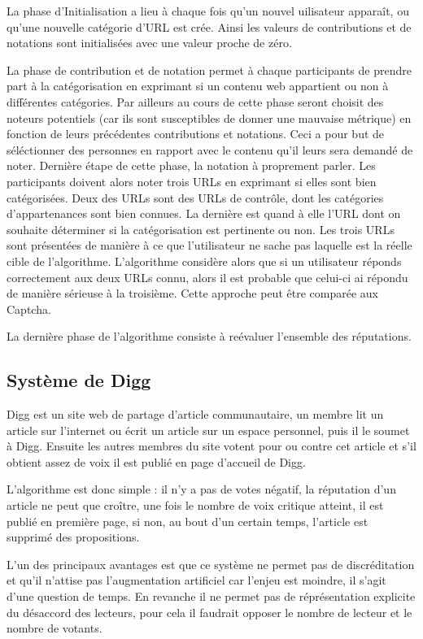 \documentclass[a4paper, 11pt]{article} %
\begin{document}
La phase d'Initialisation a lieu à chaque fois qu'un nouvel uilisateur apparaît, ou qu'une nouvelle catégorie d'URL est crée.
Ainsi les valeurs de contributions et de notations sont initialisées avec une valeur proche de zéro.

La phase de contribution et de notation permet à chaque participants de prendre part à la catégorisation en exprimant si un contenu web appartient ou non à différentes catégories.
Par ailleurs au cours de cette phase seront choisit des noteurs potentiels (car ils sont susceptibles de donner une mauvaise métrique) en fonction de leurs précédentes contributions et notations.
Ceci a pour but de séléctionner des personnes en rapport avec le contenu qu'il leurs sera demandé de noter.
Dernière étape de cette phase, la notation à proprement parler. Les participants doivent alors noter trois URLs en exprimant si elles sont bien catégorisées.
Deux des URLs sont des URLs de contrôle, dont les catégories d'appartenances sont bien connues.
La dernière est quand à elle l'URL dont on souhaite déterminer si la catégorisation est pertinente ou non.
Les trois URLs sont présentées de manière à ce que l'utilisateur ne sache pas laquelle est la réelle cible de l'algorithme.
L'algorithme considère alors que si un utilisateur réponds correctement aux deux URLs connu, alors il est probable que celui-ci ai répondu de manière sérieuse à la troisième.
Cette approche peut être comparée aux Captcha.

La dernière phase de l'algorithme consiste à reévaluer l'ensemble des réputations.

\subsection{Système de Digg}
Digg est un site web de partage d'article communautaire, un membre lit un article sur l'internet ou écrit un article sur un espace personnel, puis il le soumet à Digg.
Ensuite les autres membres du site votent pour ou contre cet article et s'il obtient assez de voix il est publié en page d'accueil de Digg.

L'algorithme est donc simple : il n'y a pas de votes négatif, la réputation d'un article ne peut que croître, une fois le nombre de voix critique atteint, il est publié en première page, si non, au bout d'un certain temps, l'article est supprimé des propositions.

L'un des principaux avantages est que ce système ne permet pas de discréditation et qu'il n'attise pas l'augmentation artificiel car l'enjeu est moindre, il s'agit d'une question de temps.
En revanche il ne permet pas de réprésentation explicite du désaccord des lecteurs, pour cela il faudrait opposer le nombre de lecteur et le nombre de votants.




\end{document}
